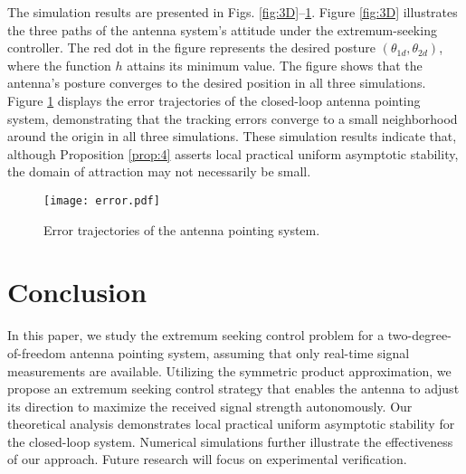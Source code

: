 \documentclass{ifacconf}
\begin{document}
The simulation results are presented in Figs. \ref{fig:3D}--\ref{fig:error}. Figure \ref{fig:3D} illustrates the three paths of the antenna system's attitude under the extremum-seeking controller. The red dot in the figure represents the desired posture \( (\theta_{1d}, \theta_{2d}) \), where the function \( h \) attains its minimum value. The figure shows that the antenna’s posture converges to the desired position in all three simulations. Figure \ref{fig:error} displays the error trajectories of the closed-loop antenna pointing system, demonstrating that the tracking errors converge to a small neighborhood around the origin in all three simulations. These simulation results indicate that, although Proposition \ref{prop:4} asserts local practical uniform asymptotic stability, the domain of attraction may not necessarily be small.

\begin{figure}[t]
\begin{center}
\texttt{[image: error.pdf]}    %
\caption{Error trajectories of the antenna pointing system.} 
\label{fig:error}
\end{center}
\end{figure}


\section{Conclusion}\label{sec:conclusion}
In this paper, we study the extremum seeking control problem for a two-degree-of-freedom antenna pointing system, assuming that only real-time signal measurements are available. Utilizing the symmetric product approximation, we propose an extremum seeking control strategy that enables the antenna to adjust its direction to maximize the received signal strength autonomously. Our theoretical analysis demonstrates local practical uniform asymptotic stability for the closed-loop system. Numerical simulations further illustrate the effectiveness of our approach. Future research will focus on experimental verification.

            
\end{document}
